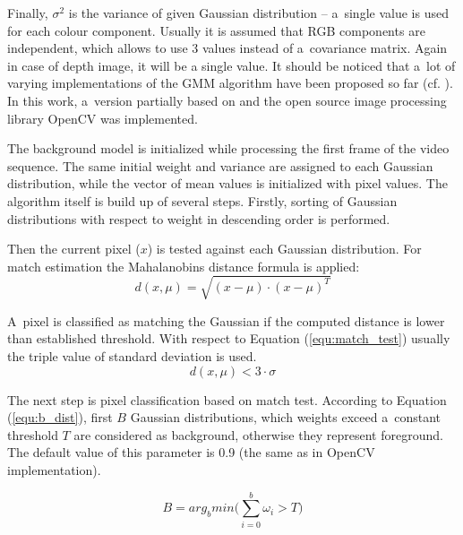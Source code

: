 \documentclass[b5paper,10pt,twoside]{article}
\begin{document}
{Finally, $\sigma^2$ is the variance of given Gaussian distribution -- a~single value is used for each colour component.
Usually it is assumed that RGB components are independent, which allows to use 3 values instead of a~covariance matrix. Again in case of depth image, it will be a single value.
It should be noticed that a~lot of varying implementations of the GMM algorithm have been proposed so far (cf. \cite{Bouwmans_2008}). 
In this work, a~version partially based on \cite{} and the open source image processing library OpenCV was implemented. 


The background model is initialized while processing the first frame of the video sequence. 
The same initial weight and variance are assigned to each Gaussian distribution, while the vector of mean values is initialized with pixel values. 
The algorithm itself is build up of several steps. 
Firstly, sorting of Gaussian distributions with respect to weight in descending order is performed. 

Then the current pixel ($x$) is tested against each Gaussian distribution. 
For match estimation the Mahalanobins distance formula is applied:
\begin{equation}
\label{equ:mah_dist}
d(x, \mu) = \sqrt{(x-\mu)\cdot(x-\mu)^T}
\end{equation}




A~pixel is classified as matching the Gaussian if the computed distance is lower than established threshold. 
With respect to Equation (\ref{equ:match_test}) usually the triple value of standard deviation is used.
\begin{equation}
\label{equ:match_test}
d(x, \mu) < 3 \cdot \sigma
\end{equation}


The next step is pixel classification based on match test. 
According to Equation (\ref{equ:b_dist}), first $B$ Gaussian distributions, which weights exceed a~constant threshold $T$ are considered as background, otherwise they represent foreground. The default value of this parameter is 0.9 (the same as in OpenCV implementation).


\begin{equation}
\label{equ:b_dist}
B = arg_b min \Bigg( \sum_{i=0}^{b}\omega_i>T \Bigg)
\end{equation}



}
\end{document}
